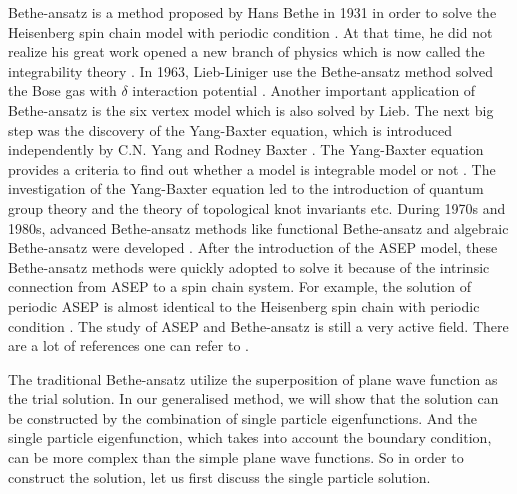 Bethe-ansatz is a method proposed by Hans Bethe in 1931 in order to solve the Heisenberg spin chain model with periodic condition \cite{Bethe1931}. At that time, he did not realize his great work opened a new branch of physics which is now called the integrability theory \cite{Batchelor2007}. In 1963, Lieb-Liniger use the Bethe-ansatz method solved the Bose gas with $\delta$ interaction potential \cite{Lieb1963a,Lieb1963}. 
Another important application of Bethe-ansatz is the six vertex model which is also solved by Lieb. The next big step was the discovery of the Yang-Baxter equation, which is introduced independently by C.N. Yang and Rodney Baxter \cite{Yang1967,Baxter1972}. The Yang-Baxter equation provides a criteria to find out whether a model is integrable model or not \cite{Batchelor2007}. The investigation of the Yang-Baxter equation led to the introduction of quantum group theory and the theory of topological knot invariants etc. 
During 1970s and 1980s, advanced Bethe-ansatz methods like functional Bethe-ansatz  and algebraic Bethe-ansatz were developed \cite{Mallick2011b}. After the introduction of the ASEP model, these Bethe-ansatz methods were quickly adopted to solve it because of the intrinsic connection from ASEP to a spin chain system. For example, the solution of periodic ASEP is almost identical to the Heisenberg spin chain with periodic condition \cite{Mallick2011b}. The study of ASEP and Bethe-ansatz is still a very active field. There are a lot of references one can refer to \cite{Derrida1998,Liggett1999,Schutz2001,Golinelli2006,Mallick2011b}. 

The traditional Bethe-ansatz utilize the superposition of plane wave function as the trial solution. In our generalised method, we will show that the solution can be constructed by the combination of single particle eigenfunctions. And the single particle eigenfunction, which takes into account the boundary condition, can be more complex than the simple plane wave functions. So in order to construct the solution, let us first discuss the single particle solution.

